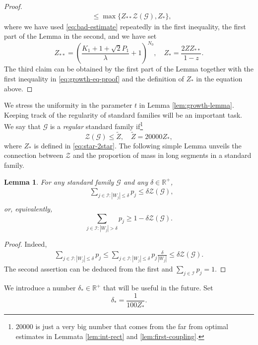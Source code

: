 \documentclass{amsart}
\numberwithin{equation}{section}
\newtheorem{lemma}[theorem]{Lemma}
\renewcommand{\ge}{\geqslant}
\renewcommand{\le}{\leqslant}
\newcommand\cG{{\mathcal G}}
\newcommand\cI{{\mathcal I}}
\newcommand\cZ{{\mathcal Z}}
\newcommand\bR{{\mathbb R}}
\begin{document}
\begin{proof}
\begin{equation}
\begin{split}
&\le \max\{Z_{**}\cZ(\cG), Z_{*}\},
\end{split}
\end{equation}
where we have used \eqref{eq:bad-estimate} repeatedly in the first inequality, the first part of the Lemma in the second, and we have set
\begin{equation}\label{eq:star-2star}
Z_{**} = \left(\frac{K_1 + 1+ \sqrt{2}P_1}{\lambda} + 1\right)^{N_0}, \quad Z_{*} = \frac{2ZZ_{**}}{1-z}.
\end{equation}
The third claim can be obtained by the first part of the Lemma together with the first inequality in \eqref{eq:growth-eq-proof} and the definition of \(Z_{*}\) in the equation above.
\end{proof}
We stress the uniformity in the parameter \(t\) in Lemma \ref{lem:growth-lemma}. Keeping track of the regularity of standard families will be an important task. We say that \(\cG\) is a \textit{regular} standard family if\footnote{\(20000\) is just a very big number that comes from the far from optimal estimates in Lemmata \ref{lem:int-rect} and \ref{lem:first-coupling}.}
\begin{equation}\label{eq:regular-sf-def}
\cZ(\cG) \le \widetilde Z, \quad \widetilde Z = 20000Z_{*},
\end{equation}
where \(Z_{*}\) is defined in \eqref{eq:star-2star}. The following simple Lemma unveils the connection between \(\cZ\) and the proportion of mass in long segments in a standard family.
\begin{lemma}\label{lem:proportion-of-good-sp}
  For any standard family \(\cG\) and any \(\delta \in \bR^+\),
  \[
  \begin{split}
    &\sum_{j \in \cI: |W_j| \le \delta}p_j \le \delta \cZ (\cG), \\
  \end{split}
  \]
  or, equivalently,
  \[
    \sum_{j \in \cI: |W_j| > \delta}p_j \ge 1 - \delta \cZ (\cG). 
  \]
\end{lemma}
\begin{proof}
Indeed,
\[
\begin{split}
  \sum_{j \in \cI: |W_j| \le \delta}p_j \le \sum_{j \in \cI: |W_j| \le \delta}p_j \frac{\delta}{|W_j|} \le \delta \cZ(\cG).
\end{split}
\]
The second assertion can be deduced from the first and \(\sum_{j \in \cI} p_j= 1\).
\end{proof}
We introduce a number \(\delta_{*} \in \bR^+\) that will be useful in the future. Set
\begin{equation}\label{eq:deltastar}
\delta_{*} = \frac{1}{100 Z_{*}}.
\end{equation}
\end{document}
